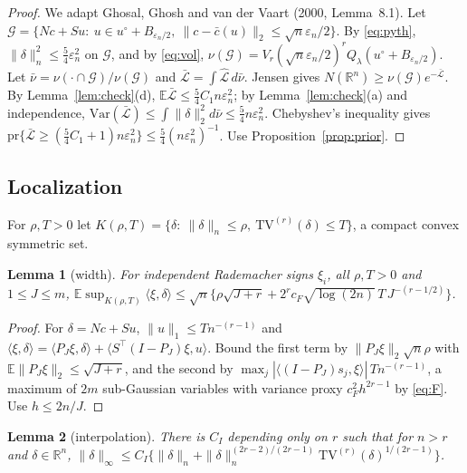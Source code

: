 \documentclass[11pt]{article}
\newtheorem{lemma}{Lemma}
\theoremstyle{definition}
\theoremstyle{remark}
\newcommand{\R}{\mathbb{R}}
\newcommand{\E}{\mathbb{E}}
\newcommand{\pr}{\mathrm{pr}}
\newcommand{\TV}{\mathrm{TV}}
\newcommand{\en}{\varepsilon_n}
\newcommand{\Lh}{\widehat{\mathcal L}}
\newcommand{\Ql}{Q_\lambda}
\newcommand{\nn}[1]{\|#1\|_n}
\begin{document}
\begin{proof}
We adapt Ghosal, Ghosh and van der Vaart (2000, Lemma~8.1). Let $\mathcal G=\{Nc+Su:\ u\in u^\circ+B_{\en/2},\ \|c-\bar c(u)\|_2\le\sqrt n\en/2\}$. By \eqref{eq:pyth}, $\nn{\delta}^2\le\tfrac54\en^2$ on $\mathcal G$, and by \eqref{eq:vol}, $\nu(\mathcal G)=V_r(\sqrt n\en/2)^r\Ql(u^\circ+B_{\en/2})$. Let $\bar\nu=\nu(\cdot\cap\mathcal G)/\nu(\mathcal G)$ and $\bar{\mathcal L}=\int\Lh\,d\bar\nu$. Jensen gives $N(\R^n)\ge\nu(\mathcal G)e^{-\bar{\mathcal L}}$. By Lemma~\ref{lem:check}(d), $\E\bar{\mathcal L}\le\tfrac54C_1n\en^2$; by Lemma~\ref{lem:check}(a) and independence, $\mathrm{Var}(\bar{\mathcal L})\le\int\|\delta\|_2^2d\bar\nu\le\tfrac54n\en^2$. Chebyshev's inequality gives $\pr\{\bar{\mathcal L}\ge(\tfrac54C_1+1)n\en^2\}\le\tfrac54(n\en^2)^{-1}$. Use Proposition~\ref{prop:prior}.
\end{proof}

\subsection{Localization}

For $\rho,T>0$ let $K(\rho,T)=\{\delta:\ \nn{\delta}\le\rho,\ \TV^{(r)}(\delta)\le T\}$, a compact convex symmetric set.

\begin{lemma}[width]\label{lem:width}
For independent Rademacher signs $\xi_i$, all $\rho,T>0$ and $1\le J\le m$,
$\E\sup_{K(\rho,T)}\langle\xi,\delta\rangle\le\sqrt n\{\rho\sqrt{J+r}+2^rc_F\sqrt{\log(2n)}\,T\,J^{-(r-1/2)}\}$.
\end{lemma}

\begin{proof}
For $\delta=Nc+Su$, $\|u\|_1\le Tn^{-(r-1)}$ and $\langle\xi,\delta\rangle=\langle P_J\xi,\delta\rangle+\langle S^\top(I-P_J)\xi,u\rangle$. Bound the first term by $\|P_J\xi\|_2\sqrt n\rho$ with $\E\|P_J\xi\|_2\le\sqrt{J+r}$, and the second by $\max_j|\langle(I-P_J)s_j,\xi\rangle|\,Tn^{-(r-1)}$, a maximum of $2m$ sub-Gaussian variables with variance proxy $c_F^2h^{2r-1}$ by \eqref{eq:F}. Use $h\le2n/J$.
\end{proof}

\begin{lemma}[interpolation]\label{lem:interp}
There is $C_I$ depending only on $r$ such that for $n>r$ and $\delta\in\R^n$,
$\|\delta\|_\infty\le C_I\{\nn{\delta}+\nn{\delta}^{(2r-2)/(2r-1)}\TV^{(r)}(\delta)^{1/(2r-1)}\}$.
\end{lemma}
\end{document}
